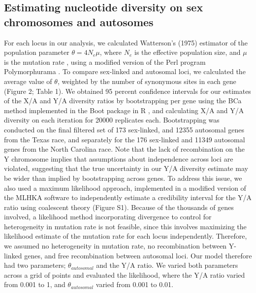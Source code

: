 \documentclass[9pt,twocolumn,twoside]{gsajnl}
\begin{document}
\subsection*{Estimating nucleotide diversity on sex chromosomes and autosomes}
For each locus in our analysis, we calculated Watterson’s (1975) estimator of the population parameter $\theta=4N_{e}\mu$, where $N_{e}$ is the effective population size, and $\mu$ is the mutation rate \citep{watterson1975}, using a modified version of the Perl program Polymorphurama \citep{bachtrog2006}. To compare sex-linked and autosomal loci, we calculated the average value of $\theta$, weighted by the number of synonymous sites in each gene (\X Figure 2; Table 1). We obtained 95 percent confidence intervals for our estimates of the X/A and Y/A diversity ratios by bootstrapping per gene using the BCa method \citep{efron1994} implemented in the Boot package in R \citep{canty2012boot}, and calculating X/A and Y/A diversity on each iteration for 20000 replicates each. Bootstrapping was conducted on the final filtered set of 173 sex-linked, and 12355 autosomal genes from the Texas race, and separately for the 176 sex-linked and 11349 autosomal genes from the North Carolina race. Note that the lack of recombination on the Y chromosome implies that assumptions about independence across loci are violated, suggesting that the true uncertainty in our Y/A diversity estimate may be wider than implied by bootstrapping across genes. To address this issue, we also used a maximum likelihood approach, implemented in a modified version of the MLHKA software \citep{wright2004hka} to independently estimate a credibility interval for the Y/A ratio using coalescent theory (Figure S1). Because of the thousands of genes involved, a likelihood method incorporating divergence to control for heterogeneity in mutation rate is not feasible, since this involves maximizing the likelihood estimate of the mutation rate for each locus independently.  Therefore, we assumed no heterogeneity in mutation rate, no recombination between Y-linked genes, and free recombination between autosomal loci. Our model therefore had two parameters; $\theta_{autosomal}$ and the Y/A ratio. We varied both parameters across a grid of points and evaluated the likelihood, where the Y/A ratio varied from 0.001 to 1, and $\theta_{autosomal}$ varied from 0.001 to 0.01.
\end{document}
